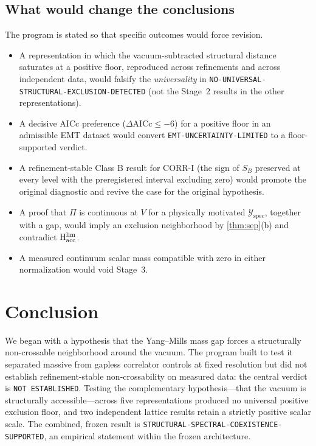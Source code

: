 \documentclass[11pt,a4paper]{article}
\theoremstyle{definition}
\theoremstyle{remark}
\newcommand{\Yspec}{\mathcal{Y}_{\mathrm{spec}}}
\newcommand{\Hacc}{\mathrm{H}_{\mathrm{acc}}}
\begin{document}
\subsection{What would change the conclusions}\label{ssec:falsifiers}
The program is stated so that specific outcomes would force revision.
\begin{itemize}
\item A representation in which the vacuum-subtracted structural distance saturates at a positive floor, reproduced across refinements and across independent data, would falsify the \emph{universality} in \texttt{NO-\allowbreak{}UNIVERSAL-\allowbreak{}STRUCTURAL-\allowbreak{}EXCLUSION-\allowbreak{}DETECTED} (not the Stage~2 results in the other representations).
\item A decisive AICc preference ($\Delta\mathrm{AICc}\le-6$) for a positive floor in an admissible EMT dataset would convert \texttt{EMT-\allowbreak{}UNCERTAINTY-\allowbreak{}LIMITED} to a floor-supported verdict.
\item A refinement-stable Class B result for CORR-I (the sign of $S_B$ preserved at every level with the preregistered interval excluding zero) would promote the original diagnostic and revive the case for the original hypothesis.
\item A proof that $\Pi$ is continuous at $V$ for a physically motivated $\Yspec$, together with a gap, would imply an exclusion neighborhood by \cref{thm:sep}(b) and contradict $\Hacc^{\rm lim}$.
\item A measured continuum scalar mass compatible with zero in either normalization would void Stage~3.
\end{itemize}

\section{Conclusion}\label{sec:conclusion}
We began with a hypothesis that the Yang--Mills mass gap forces a structurally non-crossable neighborhood around the vacuum. The program built to test it separated massive from gapless correlator controls at fixed resolution but did not establish refinement-stable non-crossability on measured data: the central verdict is \texttt{NOT ESTABLISHED}. Testing the complementary hypothesis---that the vacuum is structurally accessible---across five representations produced no universal positive exclusion floor, and two independent lattice results retain a strictly positive scalar scale. The combined, frozen result is \texttt{STRUCTURAL-\allowbreak{}SPECTRAL-\allowbreak{}COEXISTENCE-\allowbreak{}SUPPORTED}, an empirical statement within the frozen architecture.
\end{document}
